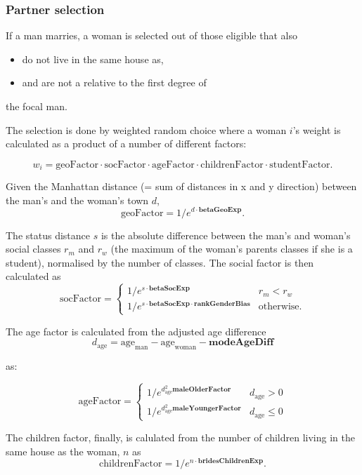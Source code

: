 \documentclass{article}
\begin{document}
\subsubsection*{Partner selection}

If a man marries, a woman is selected out of those eligible that also
\begin{itemize}
    \item do not live in the same house as,
    \item and are not a relative to the first degree of
\end{itemize}
the focal man.

The selection is done by weighted random choice where a woman $i$'s weight is calculated as a product of a number of different factors:

\[
w_i = \mathrm{geoFactor} \cdot \mathrm{socFactor} \cdot \mathrm{ageFactor} \cdot \mathrm{childrenFactor} \cdot \mathrm{studentFactor}.
\]

Given the Manhattan distance (= sum of distances in x and y direction) between the man's and the woman's town $d$, 
\[
\mathrm{geoFactor} = 1/e^{d \cdot \mathbf{betaGeoExp}}.
\]

The status distance $s$ is the absolute difference between the man's and woman's social classes $r_m$ and $r_w$ (the maximum of the woman's parents classes if she is a student), normalised by the number of classes. The social factor is then calculated as 
\[
\mathrm{socFactor} = \left\{ 
        \begin{array}{ll}
             1/e^{s \cdot \mathbf{betaSocExp}} & r_m < r_w  \\
             1/e^{s \cdot \mathbf{betaSocExp} \cdot \mathbf{rankGenderBias}} & \mathrm{otherwise}. 
        \end{array}
    \right. 
\]

The age factor is calculated from the adjusted age difference 
\[
d_\mathrm{age} = \mathrm{age}_\mathrm{man} - \mathrm{age}_\mathrm{woman} - \mathbf{modeAgeDiff}
\]

as:

\[
\mathrm{ageFactor} = \left\{
    \begin{array}{ll}
    1/e^{d_\mathrm{age}^2\mathbf{maleOlderFactor}} & d_\mathrm{age} > 0 \\
    1/e^{d_\mathrm{age}^2\mathbf{maleYoungerFactor}} & d_\mathrm{age} \leq 0 
    \end{array}
    \right.
\]

The children factor, finally, is calulated from the number of children living in the same house as the woman, $n$ as 
\[
\mathrm{childrenFactor} = 1/e^{n \cdot \mathbf{bridesChildrenExp}}.
\]
\end{document}
